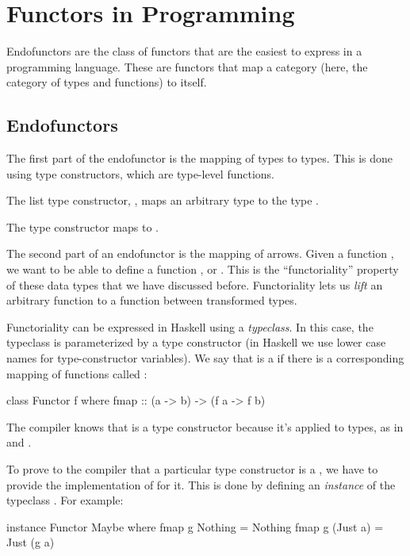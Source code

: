 \documentclass[DaoFP]{subfiles}
\begin{document}
\section{Functors in Programming}

Endofunctors are the class of functors that are the easiest to express in a programming language. These are functors that map a category (here, the category of types and functions) to itself. 

\subsection{Endofunctors}
The first part of the endofunctor is the mapping of types to types. This is done using type constructors, which are type-level functions. 

The list type constructor, , maps an arbitrary type  to the type .

The  type constructor maps  to .

The second part of an endofunctor is the mapping of arrows. Given a function , we want to be able to define a function , or . This is the ``functoriality'' property of these data types that we have discussed before. Functoriality lets us \emph{lift} an arbitrary function to a function between transformed types.

Functoriality can be expressed in Haskell using a \emph{typeclass}. In this case, the typeclass is parameterized by a type constructor  (in Haskell we use lower case names for type-constructor variables). We say that  is a  if there is a corresponding mapping of functions called :
\begin{haskell}
class Functor f where
  fmap :: (a -> b) -> (f a -> f b)
\end{haskell}
The compiler knows that  is a type constructor because it's applied to types, as in  and .

To prove to the compiler that a particular type constructor is a , we have to provide the implementation of  for it. This is done by defining an \emph{instance} of the typeclass . For example:
\begin{haskell}
instance Functor Maybe where
  fmap g Nothing  = Nothing
  fmap g (Just a) = Just (g a)
\end{haskell}
\end{document}
